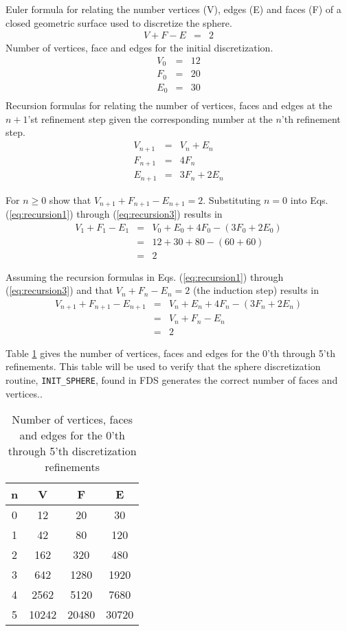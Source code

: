 \documentclass[12pt]{article}
\begin{document}
Euler formula for relating the number vertices (V), edges (E) and faces (F) of a closed geometric surface used to discretize the sphere.
\begin{eqnarray*}
V+F-E&=&2
\end{eqnarray*}
Number of vertices, face and edges for the initial discretization.
\begin{eqnarray*}
V_0&=&12\\
F_0&=&20\\
E_0&=&30\\
\end{eqnarray*}
Recursion formulas for relating the number of vertices, faces and edges at the $n+1$'st refinement step given the corresponding number at the $n$'th refinement step.
\begin{eqnarray}
\label{eq:recursion1}
V_{n+1}&=&V_n+E_n\\
\label{eq:recursion2}
F_{n+1}&=&4 F_n\\
\label{eq:recursion3}
E_{n+1}&=&3 F_n+2 E_n
\end{eqnarray}

For $n\ge 0$ show that $V_{n+1}+F_{n+1}-E_{n+1}=2$.
Substituting $n=0$ into Eqs. (\ref{eq:recursion1}) through (\ref{eq:recursion3})  results in
\begin{eqnarray*}
V_1+F_1-E_1&=&V_0+E_0+4 F_0 -(3 F_0+2 E_0)\\
&=&12+30+80-(60+60)\\
&=&2
\end{eqnarray*}

Assuming the recursion formulas in Eqs. (\ref{eq:recursion1}) through (\ref{eq:recursion3}) and that $V_n+F_n-E_n=2$ (the induction step) results in
\begin{eqnarray*}
V_{n+1}+F_{n+1}-E_{n+1}&=&V_n+E_n+4 F_n-(3 F_n+2 E_n)\\
&=&V_n+F_n-E_n\\
&=&2
\end{eqnarray*}

Table \ref{table:refinement} gives the number of vertices, faces and edges for the 0'th through 5'th refinements.
This table will be used to verify that the sphere discretization routine, {\tt INIT\_SPHERE}, found in FDS generates the correct number of faces and vertices..
\vskip 0.1in
\par
\begin{table}
\caption{Number of vertices, faces and edges for the 0'th through 5'th discretization refinements}
\begin{tabular}{|c|c|c|c|}
  \hline
n& V&F&E\\
\hline
0&	12&	20&	30\\
1&	42&	80&	120\\
2&	162&	320&	480\\
3&	642&	1280&	1920\\
4&	2562&	5120&	7680\\
5&	10242&	20480&	30720\\
  \hline
\end{tabular}
\label{table:refinement}
\end{table}
\end{document}
